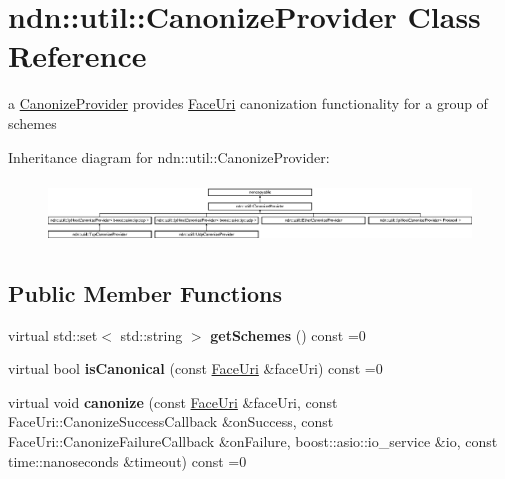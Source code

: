 \hypertarget{classndn_1_1util_1_1CanonizeProvider}{}\section{ndn\+:\+:util\+:\+:Canonize\+Provider Class Reference}
\label{classndn_1_1util_1_1CanonizeProvider}


a \hyperlink{classndn_1_1util_1_1CanonizeProvider}{Canonize\+Provider} provides \hyperlink{classndn_1_1util_1_1FaceUri}{Face\+Uri} canonization functionality for a group of schemes  


Inheritance diagram for ndn\+:\+:util\+:\+:Canonize\+Provider\+:\begin{figure}[H]
\begin{center}
\leavevmode
\includegraphics[height=1.686747cm]{classndn_1_1util_1_1CanonizeProvider}
\end{center}
\end{figure}
\subsection*{Public Member Functions}
\begin{DoxyCompactItemize}
\item 
virtual std\+::set$<$ std\+::string $>$ {\bfseries get\+Schemes} () const =0\hypertarget{classndn_1_1util_1_1CanonizeProvider_ae65477a4f97516df4a4d181a8cdacec7}{}\label{classndn_1_1util_1_1CanonizeProvider_ae65477a4f97516df4a4d181a8cdacec7}

\item 
virtual bool {\bfseries is\+Canonical} (const \hyperlink{classndn_1_1util_1_1FaceUri}{Face\+Uri} \&face\+Uri) const =0\hypertarget{classndn_1_1util_1_1CanonizeProvider_a6da84f87e0865ab6888a8afb01e75093}{}\label{classndn_1_1util_1_1CanonizeProvider_a6da84f87e0865ab6888a8afb01e75093}

\item 
virtual void {\bfseries canonize} (const \hyperlink{classndn_1_1util_1_1FaceUri}{Face\+Uri} \&face\+Uri, const Face\+Uri\+::\+Canonize\+Success\+Callback \&on\+Success, const Face\+Uri\+::\+Canonize\+Failure\+Callback \&on\+Failure, boost\+::asio\+::io\+\_\+service \&io, const time\+::nanoseconds \&timeout) const =0\hypertarget{classndn_1_1util_1_1CanonizeProvider_a8ab7279b6f0c410d1c58186402ef2156}{}\label{classndn_1_1util_1_1CanonizeProvider_a8ab7279b6f0c410d1c58186402ef2156}

\end{DoxyCompactItemize}


